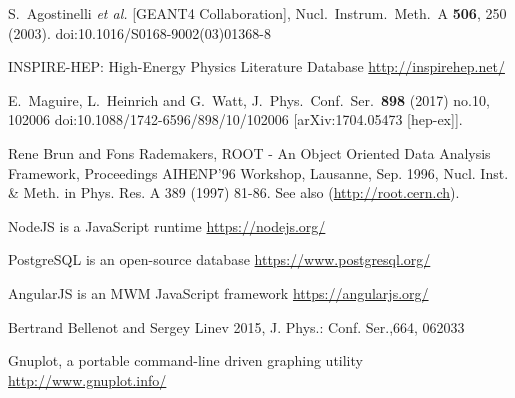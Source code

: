 \begin{thebibliography}{}
%
%
S.~Agostinelli {\it et al.} [GEANT4 Collaboration],
  Nucl.\ Instrum.\ Meth.\ A {\bf 506}, 250 (2003).
  doi:10.1016/S0168-9002(03)01368-8

INSPIRE-HEP: High-Energy Physics Literature Database \url{http://inspirehep.net/}

  E.~Maguire, L.~Heinrich and G.~Watt,
  J.\ Phys.\ Conf.\ Ser.\  {\bf 898} (2017) no.10,  102006
  doi:10.1088/1742-6596/898/10/102006
  [arXiv:1704.05473 [hep-ex]].

    Rene Brun and Fons Rademakers,
    ROOT - An Object Oriented Data Analysis Framework,
    Proceedings AIHENP'96 Workshop, Lausanne, Sep. 1996, Nucl. Inst. \& Meth. in Phys. Res. A 389 (1997) 81-86. See also (\url{http://root.cern.ch}).

NodeJS is a JavaScript runtime \url{https://nodejs.org/}

PostgreSQL is an open-source database \url{https://www.postgresql.org/}

AngularJS is an MWM JavaScript framework \url{https://angularjs.org/}

Bertrand Bellenot and Sergey Linev 2015, J. Phys.: Conf. Ser.,664,  062033

Gnuplot, a portable command-line driven graphing utility \url{http://www.gnuplot.info/}

\end{thebibliography}